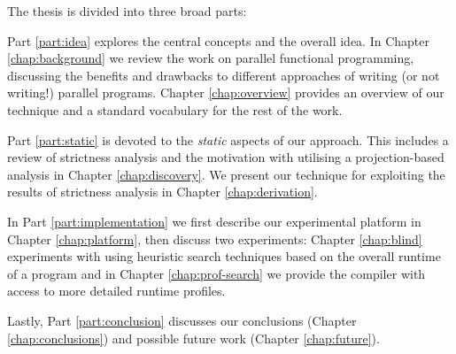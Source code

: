 The thesis is divided into three broad parts:

Part \ref{part:idea} explores the central concepts and the overall idea.  In
Chapter \ref{chap:background} we review the work on parallel functional
programming, discussing the benefits and drawbacks to different approaches of
writing (or not writing!) parallel programs.  Chapter \ref{chap:overview}
provides an overview of our technique and a standard vocabulary for the rest of
the work.  

Part \ref{part:static} is devoted to the \emph{static} aspects of our approach.
This includes a review of strictness analysis and the motivation with utilising
a projection-based analysis in Chapter \ref{chap:discovery}. We present our
technique for exploiting the results of strictness analysis in Chapter
\ref{chap:derivation}.

In Part \ref{part:implementation} we first describe our experimental platform
in Chapter \ref{chap:platform}, then discuss two experiments: Chapter
\ref{chap:blind} experiments with using heuristic search techniques based on
the overall runtime of a program and in Chapter \ref{chap:prof-search} we
provide the compiler with access to more detailed runtime profiles. 

Lastly, Part \ref{part:conclusion} discusses our conclusions (Chapter
\ref{chap:conclusions}) and possible future work (Chapter \ref{chap:future}).
